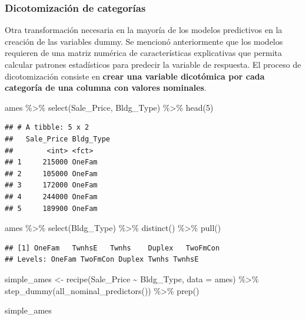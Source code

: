 \documentclass[
]{book}
\newenvironment{Shaded}{\begin{snugshade}}{\end{snugshade}}
\newcommand{\AttributeTok}[1]{\textcolor[rgb]{0.77,0.63,0.00}{#1}}
\newcommand{\DecValTok}[1]{\textcolor[rgb]{0.00,0.00,0.81}{#1}}
\newcommand{\FunctionTok}[1]{\textcolor[rgb]{0.00,0.00,0.00}{#1}}
\newcommand{\NormalTok}[1]{#1}
\newcommand{\OtherTok}[1]{\textcolor[rgb]{0.56,0.35,0.01}{#1}}
\newcommand{\SpecialCharTok}[1]{\textcolor[rgb]{0.00,0.00,0.00}{#1}}
\begin{document}
\hypertarget{dicotomizaciuxf3n-de-categoruxedas}{%
\subsubsection{Dicotomización de categorías}\label{dicotomizaciuxf3n-de-categoruxedas}}

Otra transformación necesaria en la mayoría de los modelos predictivos en la creación de las variables dummy. Se mencionó anteriormente que los modelos requieren de una matriz numérica de características explicativas que permita calcular patrones estadísticos para predecir la variable de respuesta. El proceso de dicotomización consiste en \textbf{crear una variable dicotómica por cada categoría de una columna con valores nominales}.

\begin{Shaded}
\begin{Highlighting}[]
\NormalTok{ames }\SpecialCharTok{\%\textgreater{}\%} \FunctionTok{select}\NormalTok{(Sale\_Price, Bldg\_Type) }\SpecialCharTok{\%\textgreater{}\%} \FunctionTok{head}\NormalTok{(}\DecValTok{5}\NormalTok{)}
\end{Highlighting}
\end{Shaded}

\begin{verbatim}
## # A tibble: 5 x 2
##   Sale_Price Bldg_Type
##        <int> <fct>    
## 1     215000 OneFam   
## 2     105000 OneFam   
## 3     172000 OneFam   
## 4     244000 OneFam   
## 5     189900 OneFam
\end{verbatim}

\begin{Shaded}
\begin{Highlighting}[]
\NormalTok{ames }\SpecialCharTok{\%\textgreater{}\%} \FunctionTok{select}\NormalTok{(Bldg\_Type) }\SpecialCharTok{\%\textgreater{}\%} \FunctionTok{distinct}\NormalTok{() }\SpecialCharTok{\%\textgreater{}\%} \FunctionTok{pull}\NormalTok{()}
\end{Highlighting}
\end{Shaded}

\begin{verbatim}
## [1] OneFam   TwnhsE   Twnhs    Duplex   TwoFmCon
## Levels: OneFam TwoFmCon Duplex Twnhs TwnhsE
\end{verbatim}

\begin{Shaded}
\begin{Highlighting}[]
\NormalTok{simple\_ames }\OtherTok{\textless{}{-}} \FunctionTok{recipe}\NormalTok{(Sale\_Price }\SpecialCharTok{\textasciitilde{}}\NormalTok{ Bldg\_Type, }\AttributeTok{data =}\NormalTok{ ames) }\SpecialCharTok{\%\textgreater{}\%}
  \FunctionTok{step\_dummy}\NormalTok{(}\FunctionTok{all\_nominal\_predictors}\NormalTok{()) }\SpecialCharTok{\%\textgreater{}\%} 
  \FunctionTok{prep}\NormalTok{()}

\NormalTok{simple\_ames}
\end{Highlighting}
\end{Shaded}
\end{document}
